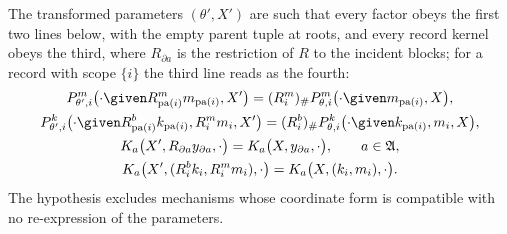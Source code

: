 The transformed parameters $(\theta',X')$ are such that every factor obeys the first two lines below,
with the empty parent tuple at roots, and every record kernel obeys the third, where $R_{\partial a}$ is
the restriction of $R$ to the incident blocks; for a record with scope $\{i\}$ the third line reads as
the fourth:
\begin{gather}
P_{\theta',i}^{m}\bigl(\cdot\given R_{\operatorname{pa}(i)}^mm_{\operatorname{pa}(i)},X'\bigr)
=(R_i^m)_\#P_{\theta,i}^{m}\bigl(\cdot\given m_{\operatorname{pa}(i)},X\bigr),
\label{eq:gen-gauge-pushforward-model}\\
P_{\theta',i}^{k}\bigl(\cdot\given R_{\operatorname{pa}(i)}^bk_{\operatorname{pa}(i)},R_i^mm_i,X'\bigr)
=(R_i^b)_\#P_{\theta,i}^{k}\bigl(\cdot\given k_{\operatorname{pa}(i)},m_i,X\bigr),
\label{eq:gen-gauge-pushforward-state}\\
K_a\bigl(X',R_{\partial a}y_{\partial a},\cdot\bigr)=K_a\bigl(X,y_{\partial a},\cdot\bigr),
\qquad a\in\mathfrak A,
\label{eq:gen-gauge-record-kernel}\\
K_a\bigl(X',(R_i^bk_i,R_i^mm_i),\cdot\bigr)=K_a\bigl(X,(k_i,m_i),\cdot\bigr).
\label{eq:gen-gauge-pushforward-obs}
\end{gather}
The hypothesis excludes mechanisms whose coordinate form is compatible with no re-expression of the
parameters.

